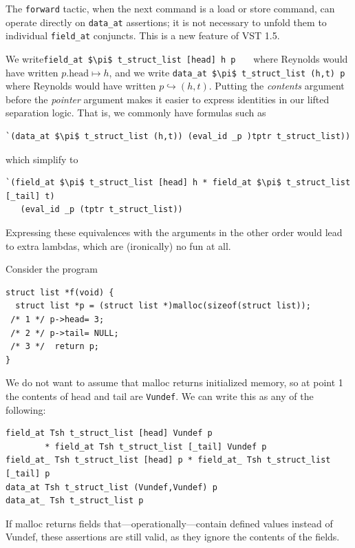 \documentclass[12pt,fleqn,openany,oneside,showtrims]{memoir}
\begin{document}
The \lstinline{forward} tactic, when the next command is a load
or store command, can operate directly on \lstinline{data_at}
assertions; it is not necessary to unfold them to individual
\lstinline{field_at} conjuncts.  This is a new feature
of VST 1.5.

We write\newline \lstinline{field_at $\pi$ t_struct_list [head] h p}
\ \ \ where Reynolds would have written $p.\mathrm{head}\mapsto h$,
and we write
\lstinline{data_at $\pi$ t_struct_list (h,t) p}
where Reynolds would have written $p\hookrightarrow(h,t)$.
Putting the \emph{contents} argument before the \emph{pointer}
argument makes it easier to express identities in our lifted
separation logic.  That is, we commonly have formulas such as
\begin{lstlisting}
`(data_at $\pi$ t_struct_list (h,t)) (eval_id _p )tptr t_struct_list))
\end{lstlisting}
\vspace{-\baselineskip}
which simplify to
\begin{lstlisting}
`(field_at $\pi$ t_struct_list [head] h * field_at $\pi$ t_struct_list [_tail] t)
   (eval_id _p (tptr t_struct_list))
\end{lstlisting}
\vspace{-\baselineskip}
Expressing these equivalences with the arguments in the other order
would lead to extra lambdas, which are
(ironically) no fun at all.

Consider the program
\begin{lstlisting}
struct list *f(void) {
  struct list *p = (struct list *)malloc(sizeof(struct list));
 /* 1 */ p->head= 3;
 /* 2 */ p->tail= NULL;
 /* 3 */  return p;
}
\end{lstlisting}
We do not want to assume that malloc returns initialized memory,
so at point 1 the contents of head and tail are \lstinline{Vundef}.
We can write this as any of the following:
\begin{lstlisting}
field_at Tsh t_struct_list [head] Vundef p
        * field_at Tsh t_struct_list [_tail] Vundef p
field_at_ Tsh t_struct_list [head] p * field_at_ Tsh t_struct_list [_tail] p
data_at Tsh t_struct_list (Vundef,Vundef) p
data_at_ Tsh t_struct_list p
\end{lstlisting}
If malloc returns fields that---operationally---contain defined
values instead of Vundef, these assertions are still valid,
as they ignore the contents of the fields.
\end{document}
